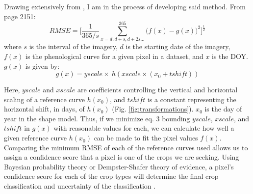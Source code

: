 Drawing extensively from \textcite{sakamoto2010a-two-step}, I am in the process of developing said method. From page 2151:
\begin{equation}
  RMSE = \biggl[\frac{1}{365/s}\sum_{x=d,d+s,d+2s...}^{365}\bigl(f\left(x\right)-g\left(x\right)\bigr)^{2}\biggr]^{\frac{1}{2}}
\end{equation}
where $s$ is the interval of the imagery, $d$ is the starting date of the imagery, $f(x)$ is the phenological curve for a given pixel in a dataset, and $x$ is the DOY. $g(x)$ is given by:
\begin{equation}\label{eq2}
  g(x) = yscale\times~h\left(xscale\times(x_0 + tshift)\right)
\end{equation}

Here, $yscale$ and  $xscale$ are coefficients controlling the vertical and horizontal scaling of a reference curve $h(x_0)$, and $tshift$ is a constant representing the horizontal shift, in days, of $h(x_0)$ (Fig. \ref{fig:transformations}). $x_0$ is the day of year in the shape model. Thus, if we minimize eq. 3 bounding $yscale$, $xscale$, and $tshift$  in $g(x)$ with reasonable values for each, we can calculate how well a given reference curve $h(x_0)$ can be made to fit the pixel values $f(x)$. Comparing the minimum RMSE of each of the reference curves used allows us to assign a confidence score that a pixel is one of the crops we are seeking. Using Bayesian probability theory or Dempster-Shafer theory of evidence, a pixel's confidence score for each of the crop types will determine the final crop classification and uncertainty of the classification \autocite{jiang2000application}.


